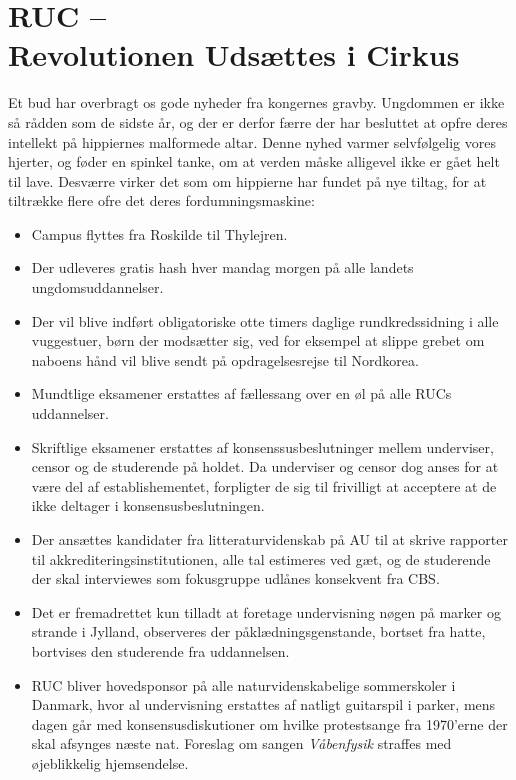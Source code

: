 

\begin{minipage}[b]{0.95\linewidth}
\begin{minipage}[t]{0.47\textwidth}
\vspace{3mm}
\section*{RUC -- \\ Revolutionen Udsættes i Cirkus}
Et bud har overbragt os gode nyheder fra kongernes gravby. Ungdommen er ikke så rådden som de sidste år, og der er derfor færre der har besluttet at opfre deres intellekt på hippiernes malformede altar. Denne nyhed varmer selvfølgelig vores hjerter, og føder en spinkel tanke, om at verden måske alligevel ikke er gået helt til lave. Desværre virker det som om hippierne har fundet på nye tiltag, for at tiltrække flere ofre det deres fordumningsmaskine:
\begin{itemize}
\item Campus flyttes fra Roskilde til Thylejren.
\item Der udleveres gratis hash hver mandag morgen på alle landets ungdomsuddannelser.
\item Der vil blive indført obligatoriske otte timers daglige rundkredssidning i alle vuggestuer, børn der modsætter sig, ved for eksempel at slippe grebet om naboens hånd vil blive sendt på opdragelsesrejse til Nordkorea.
\item Mundtlige eksamener erstattes af fællessang over en øl på alle RUCs uddannelser.
\item Skriftlige eksamener erstattes af konsenssusbeslutninger mellem underviser, censor og de studerende på holdet. Da underviser og censor dog anses for at være del af establishementet, forpligter de sig til frivilligt at acceptere at de ikke deltager i konsensusbeslutningen.
\item Der ansættes kandidater fra litteraturvidenskab på AU til at skrive rapporter til akkrediteringsinstitutionen, alle tal estimeres ved gæt, og de studerende der skal interviewes som fokusgruppe udlånes konsekvent fra CBS.
\item Det er fremadrettet kun tilladt at foretage undervisning nøgen på marker og strande i Jylland, observeres der påklædningsgenstande, bortset fra hatte, bortvises den studerende fra uddannelsen.
\item RUC bliver hovedsponsor på alle naturvidenskabelige sommerskoler i Danmark, hvor al undervisning erstattes af natligt guitarspil i parker, mens dagen går med konsensusdiskutioner om hvilke protestsange fra 1970'erne der skal afsynges næste nat. Foreslag om sangen \emph{Våbenfysik} straffes med øjeblikkelig hjemsendelse.

\end{itemize}
\end{minipage}
\end{minipage}
